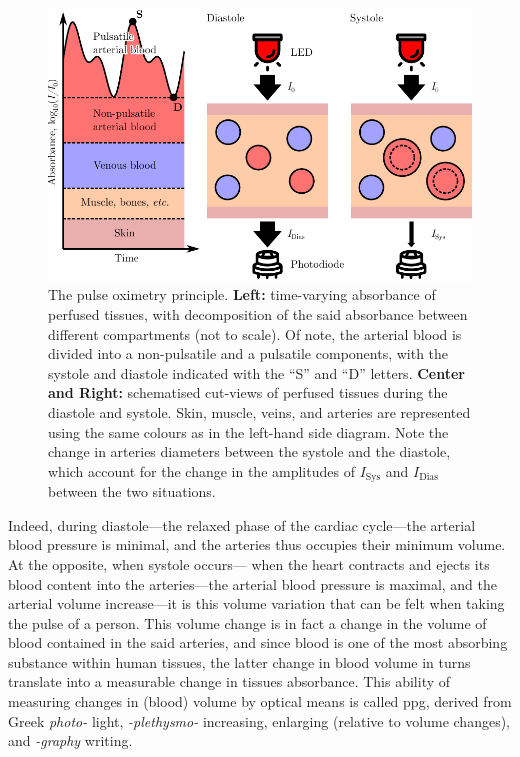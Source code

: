 \begin{figure}
	\centering
	\includegraphics{1_main_matter/co2hb_figures/ppg_principle.pdf}
	\caption[Pulse oximetry principle.]{The pulse oximetry principle. \textbf{Left:} time-varying absorbance of perfused tissues, with decomposition of the said absorbance between different compartments (not to scale). Of note, the arterial blood is divided into a non-pulsatile and a pulsatile components, with the systole and diastole indicated with the \enquote{S} and \enquote{D} letters. \textbf{Center and Right:} schematised cut-views of perfused tissues during the diastole and systole. Skin, muscle, veins, and arteries are represented using the same colours as in the left-hand side diagram. Note the change in arteries diameters between the systole and the diastole, which account for the change in the amplitudes of $I_\text{Sys}$ and $I_\text{Dias}$ between the two situations.}
	\label{fig:co2hb:ppg_principle}
\end{figure}


Indeed, during diastole---the relaxed phase of the cardiac cycle---the arterial blood pressure is minimal, and the arteries thus occupies their minimum volume. At the opposite, when systole occurs---\ie{} when the heart contracts and ejects its blood content into the arteries---the arterial blood pressure is maximal, and the arterial volume increase---it is this volume variation that can be felt when taking the pulse of a person. This volume change is in fact a change in the volume of blood contained in the said arteries, and since blood is one of the most absorbing substance within human tissues\cite{jacques2013}, the latter change in blood volume in turns translate into a measurable change in tissues absorbance. This ability of measuring changes in (blood) volume by optical means is called \gls{ppg}, derived from Greek \emph{photo-} light, \emph{-plethysmo-} increasing, enlarging (relative to volume changes), and \emph{-graphy} writing.

